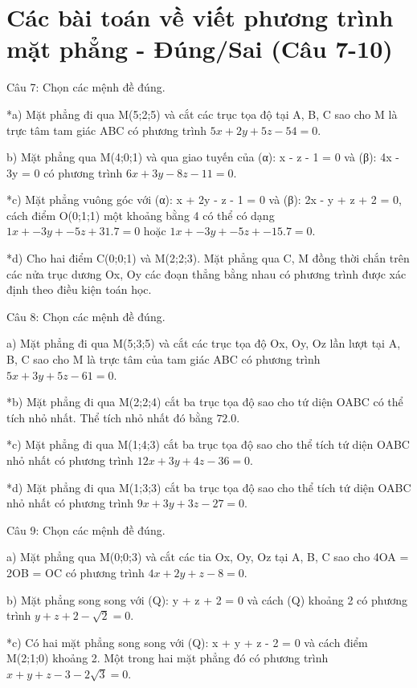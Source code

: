 \documentclass[a4paper,12pt]{article}
\begin{document}
\section*{Các bài toán về viết phương trình mặt phẳng - Đúng/Sai (Câu 7-10)}

Câu 7: Chọn các mệnh đề đúng.

*a) Mặt phẳng đi qua M(5;2;5) và cắt các trục tọa độ tại A, B, C sao cho M là trực tâm tam giác ABC có phương trình \(5x + 2y + 5z - 54 = 0\).

b) Mặt phẳng qua M(4;0;1) và qua giao tuyến của (α): x - z - 1 = 0 và (β): 4x - 3y = 0 có phương trình \(6x + 3y - 8z - 11 = 0\).

*c) Mặt phẳng vuông góc với (α): x + 2y - z - 1 = 0 và (β): 2x - y + z + 2 = 0, cách điểm O(0;1;1) một khoảng bằng 4 có thể có dạng \(1x + -3y + -5z + 31.7 = 0\) hoặc \(1x + -3y + -5z + -15.7 = 0\).

*d) Cho hai điểm C(0;0;1) và M(2;2;3). Mặt phẳng qua C, M đồng thời chắn trên các nửa trục dương Ox, Oy các đoạn thẳng bằng nhau có phương trình được xác định theo điều kiện toán học.



Câu 8: Chọn các mệnh đề đúng.

a) Mặt phẳng đi qua M(5;3;5) và cắt các trục tọa độ Ox, Oy, Oz lần lượt tại A, B, C sao cho M là trực tâm của tam giác ABC có phương trình \(5x + 3y + 5z - 61 = 0\).

*b) Mặt phẳng đi qua M(2;2;4) cắt ba trục tọa độ sao cho tứ diện OABC có thể tích nhỏ nhất. Thể tích nhỏ nhất đó bằng \(72.0\).

*c) Mặt phẳng đi qua M(1;4;3) cắt ba trục tọa độ sao cho thể tích tứ diện OABC nhỏ nhất có phương trình \(12x + 3y + 4z - 36 = 0\).

*d) Mặt phẳng đi qua M(1;3;3) cắt ba trục tọa độ sao cho thể tích tứ diện OABC nhỏ nhất có phương trình \(9x + 3y + 3z - 27 = 0\).



Câu 9: Chọn các mệnh đề đúng.

a) Mặt phẳng qua M(0;0;3) và cắt các tia Ox, Oy, Oz tại A, B, C sao cho 4OA = 2OB = OC có phương trình \(4x + 2y + z - 8 = 0\).

b) Mặt phẳng song song với (Q): y + z + 2 = 0 và cách (Q) khoảng 2 có phương trình \(y + z + 2 - \sqrt{2} = 0\).

*c) Có hai mặt phẳng song song với (Q): x + y + z - 2 = 0 và cách điểm M(2;1;0) khoảng 2. Một trong hai mặt phẳng đó có phương trình \(x + y + z - 3 - 2\sqrt{3} = 0\).
\end{document}
